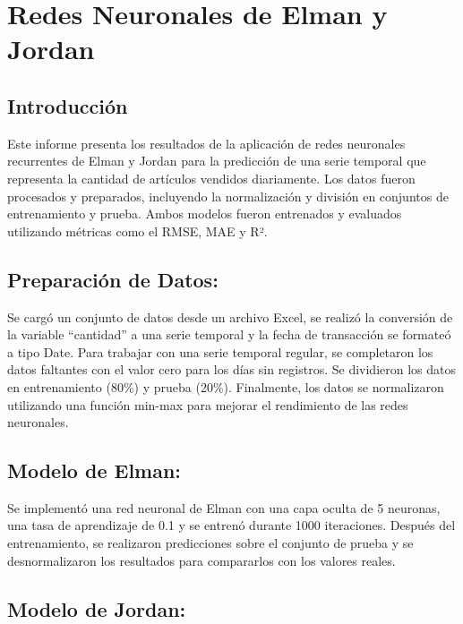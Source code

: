 \documentclass[
]{book}
\begin{document}
\chapter{Redes Neuronales de Elman y Jordan}\label{redes-neuronales-de-elman-y-jordan}

\section{Introducción}\label{introducciuxf3n-3}

Este informe presenta los resultados de la aplicación de redes neuronales recurrentes de Elman y Jordan para la predicción de una serie temporal que representa la cantidad de artículos vendidos diariamente. Los datos fueron procesados y preparados, incluyendo la normalización y división en conjuntos de entrenamiento y prueba. Ambos modelos fueron entrenados y evaluados utilizando métricas como el RMSE, MAE y R².

\section{Preparación de Datos:}\label{preparaciuxf3n-de-datos}

Se cargó un conjunto de datos desde un archivo Excel, se realizó la conversión de la variable ``cantidad'' a una serie temporal y la fecha de transacción se formateó a tipo Date. Para trabajar con una serie temporal regular, se completaron los datos faltantes con el valor cero para los días sin registros. Se dividieron los datos en entrenamiento (80\%) y prueba (20\%). Finalmente, los datos se normalizaron utilizando una función min-max para mejorar el rendimiento de las redes neuronales.

\section{Modelo de Elman:}\label{modelo-de-elman}

Se implementó una red neuronal de Elman con una capa oculta de 5 neuronas, una tasa de aprendizaje de 0.1 y se entrenó durante 1000 iteraciones. Después del entrenamiento, se realizaron predicciones sobre el conjunto de prueba y se desnormalizaron los resultados para compararlos con los valores reales.

\section{Modelo de Jordan:}\label{modelo-de-jordan}
\end{document}
